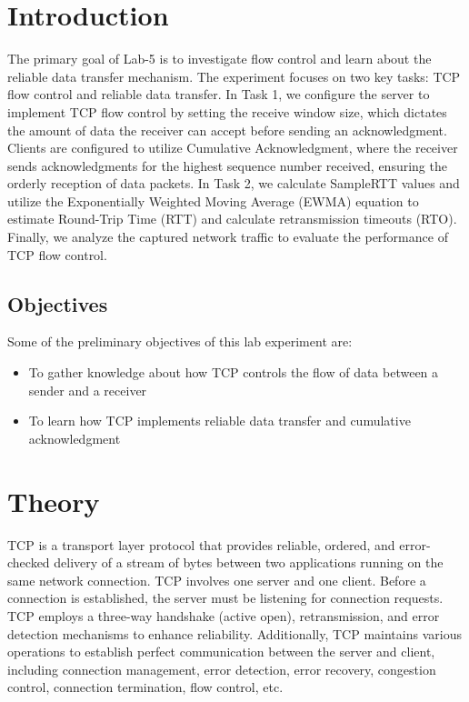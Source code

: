 \documentclass[11pt]{article}
\begin{document}
\section{Introduction}
The primary goal of Lab-5 is to investigate flow control and learn about the reliable data transfer mechanism. The experiment focuses on two key tasks: TCP flow control and reliable data transfer. In Task 1, we configure the server to implement TCP flow control by setting the receive window size, which dictates the amount of data the receiver can accept before sending an acknowledgment. Clients are configured to utilize Cumulative Acknowledgment, where the receiver sends acknowledgments for the highest sequence number received, ensuring the orderly reception of data packets. In Task 2, we calculate SampleRTT values and utilize the Exponentially Weighted Moving Average (EWMA) equation to estimate Round-Trip Time (RTT) and calculate retransmission timeouts (RTO). Finally, we analyze the captured network traffic to evaluate the performance of TCP flow control.
\subsection{Objectives}
Some of the preliminary objectives of this lab experiment are:
\begin{itemize}
   \item To gather knowledge about how TCP controls the flow of data between a sender and a receiver
   \item To learn how TCP implements reliable data transfer and cumulative acknowledgment
\end{itemize}

\section{Theory}
TCP is a transport layer protocol that provides reliable, ordered, and error-checked delivery of a stream of bytes between two applications running on the same network connection. TCP involves one server and one client. Before a connection is established, the server must be listening for connection requests. TCP employs a three-way handshake (active open), retransmission, and error detection mechanisms to enhance reliability. Additionally, TCP maintains various operations to establish perfect communication between the server and client, including connection management, error detection, error recovery, congestion control, connection termination, flow control, etc.
\end{document}
